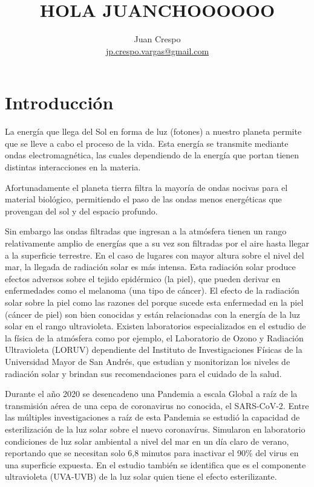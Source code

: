 \documentclass[letterpaper,11pt]{article}
\title{HOLA JUANCHOOOOOO}
\author{Juan Crespo  \\  \url{jp.crespo.vargas@gmail.com}}
\date{} %
\begin{document}
\maketitle


\begin{abstract}
  
\end{abstract}
  
\section{Introducción}
\label{sec:intro}
La energía que llega del Sol en forma de luz (fotones) a nuestro planeta permite que se lleve a cabo el proceso de la vida. Esta energía se transmite mediante ondas electromagnética, las cuales dependiendo de la energía que portan tienen distintas interacciones en la materia. 

Afortunadamente el planeta tierra filtra la mayoría de ondas nocivas para el material biológico, permitiendo el paso de las ondas menos energéticas que provengan del sol y del espacio profundo.

Sin embargo las ondas filtradas que ingresan a la atmósfera tienen un rango relativamente amplio de energías que a su vez son filtradas por el aire hasta llegar a la superficie terrestre. En el caso de lugares con mayor altura sobre el nivel del mar, la llegada de radiación solar es más intensa. Esta radiación solar produce efectos adversos sobre el tejido epidérmico (la piel), que pueden derivar en enfermedades como el melanoma (una tipo de cáncer). El efecto de la radiación solar sobre la piel como las razones del porque sucede esta enfermedad en la piel (cáncer de piel) son bien conocidas y están relacionadas con la energía de la luz solar en el rango ultravioleta. Existen laboratorios especializados en el estudio de la física de la atmósfera como por ejemplo, el Laboratorio de Ozono y Radiación Ultravioleta (LORUV) dependiente del Instituto de Investigaciones Físicas de la Universidad Mayor de San Andrés, que estudian y monitorizan los niveles de radiación solar y brindan sus recomendaciones para el cuidado de la salud. 

Durante el año 2020 se desencadeno una Pandemia a escala Global a raíz de la transmisión aérea de una cepa de coronavirus no conocida, el SARS-CoV-2. Entre las múltiples investigaciones a raíz de esta Pandemia se estudió la capacidad de esterilización de la luz solar \cite{covidsol} sobre el nuevo coronavírus. Simularon en laboratorio condiciones de luz solar ambiental a nivel del mar en un día claro de verano, reportando que se necesitan solo 6,8 minutos para inactivar el 90\% del virus en una superficie expuesta. En el estudio también se identifica que es el componente ultravioleta (UVA-UVB) de la luz solar quien tiene el efecto esterilizante. 
\end{document}
